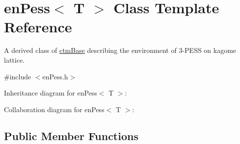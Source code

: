 \hypertarget{classenPess}{}\section{en\+Pess$<$ T $>$ Class Template Reference}
\label{classenPess}


A derived class of \hyperlink{classctmBase}{ctm\+Base} describing the environment of 3-\/\+P\+E\+SS on kagome lattice.  




{\ttfamily \#include $<$en\+Pess.\+h$>$}



Inheritance diagram for en\+Pess$<$ T $>$\+:


Collaboration diagram for en\+Pess$<$ T $>$\+:
\subsection*{Public Member Functions}
